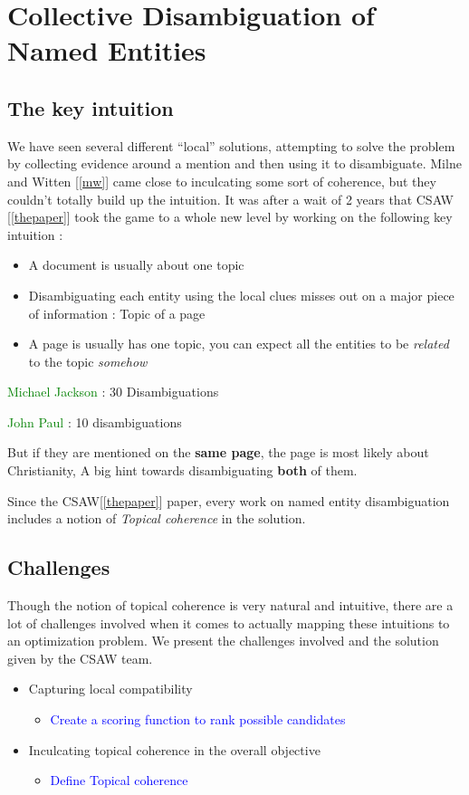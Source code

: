 \chapter{Collective Disambiguation of Named Entities}
\section{The key intuition}
We have seen several different ``local'' solutions, attempting to solve the problem by collecting evidence
around a mention and then using it to disambiguate. Milne and Witten [\ref{mw}] 
came close to inculcating some sort of coherence, but they couldn't totally build up the intuition. It was after a wait of 2 years that CSAW [\ref{thepaper}] took the game 
to a whole new level by working on the following key intuition :	
\begin{itemize}
  \item A document is usually about one topic \bigskip
  \item Disambiguating each entity using the local clues misses out on a major piece of information : Topic of a page \bigskip
  \item A page is usually has one topic, you can expect all the entities to be \emph{related} to the topic \emph{somehow} \bigskip
  \end{itemize}
  \textcolor{green}{Michael Jackson} : 30 Disambiguations 
  
 \textcolor{green}{John Paul} : 10 disambiguations 
 
 
 
  But if they are mentioned on the \textbf{same page}, the page is most likely about Christianity,
  A big hint towards disambiguating \textbf{both} of them.
  
Since the CSAW[\ref{thepaper}] paper, every work on named entity disambiguation includes a 
notion of \emph{Topical coherence} in the solution. 

\section{Challenges}
Though the notion of topical coherence is very natural and intuitive, there are 
a lot of challenges involved when it comes to actually mapping these intuitions to an optimization
problem.
We present the challenges involved and the solution given by the CSAW team.
 \begin{itemize}
  \item Capturing local compatibility
  \begin{itemize}
   \item \textcolor{blue}{Create a scoring function to rank possible candidates}
  \end{itemize}

  \item Inculcating topical coherence in the overall objective

  \begin{itemize}
   \item \textcolor{blue}{Define Topical coherence}
  \end{itemize}

  \end{itemize}

